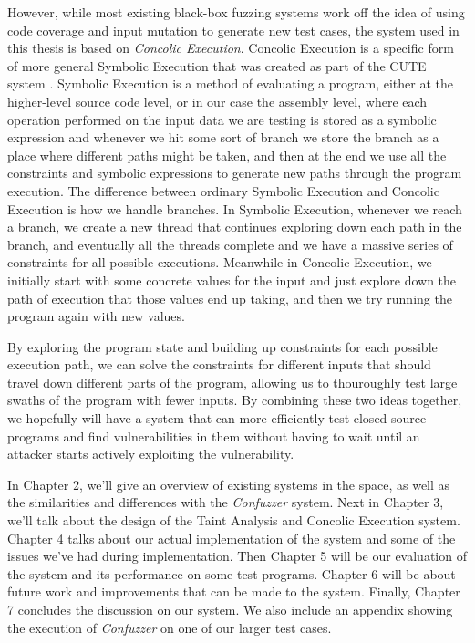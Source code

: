 However, while most existing black-box fuzzing systems work off the idea of
using code coverage and input mutation to generate new test cases, the system
used in this thesis is based on \textit{Concolic Execution}. Concolic Execution
is a specific form of more general Symbolic Execution that was created as part
of the CUTE system \cite{cutesystem}. Symbolic Execution is a method of
evaluating a program, either at the higher-level source code level, or in our
case the assembly level, where each operation performed on the input data we are
testing is stored as a symbolic expression and whenever we hit some sort of
branch we store the branch as a place where different paths might be taken, and
then at the end we use all the constraints and symbolic expressions to generate
new paths through the program execution. The difference between ordinary
Symbolic Execution and Concolic Execution is how we handle branches. In Symbolic
Execution, whenever we reach a branch, we create a new thread that continues
exploring down each path in the branch, and eventually all the threads complete
and we have a massive series of constraints for all possible
executions. Meanwhile in Concolic Execution, we initially start with some
concrete values for the input and just explore down the path of execution that
those values end up taking, and then we try running the program again with new
values.

By exploring the program state and building up constraints for each possible
execution path, we can solve the constraints for different inputs that should
travel down different parts of the program, allowing us to thouroughly test
large swaths of the program with fewer inputs. By combining these two ideas
together, we hopefully will have a system that can more efficiently test closed
source programs and find vulnerabilities in them without having to wait until an
attacker starts actively exploiting the vulnerability.

In Chapter 2, we'll give an overview of existing systems in the space, as well
as the similarities and differences with the \textit{Confuzzer} system. Next in
Chapter 3, we'll talk about the design of the Taint Analysis and Concolic
Execution system. Chapter 4 talks about our actual implementation of the system
and some of the issues we've had during implementation. Then Chapter 5 will be
our evaluation of the system and its performance on some test programs. Chapter
6 will be about future work and improvements that can be made to the
system. Finally, Chapter 7 concludes the discussion on our system. We also
include an appendix showing the execution of \textit{Confuzzer} on one of our
larger test cases.
